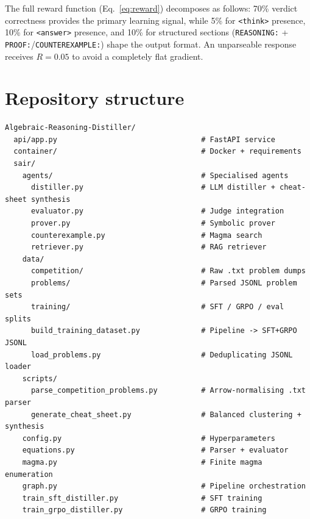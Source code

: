 \documentclass{article}
\begin{document}
The full reward function (Eq.~\ref{eq:reward}) decomposes as follows: 70\% verdict correctness provides the primary learning signal, while 5\% for \texttt{<think>} presence, 10\% for \texttt{<answer>} presence, and 10\% for structured sections (\texttt{REASONING:} + \texttt{PROOF:}/\texttt{COUNTEREXAMPLE:}) shape the output format. An unparseable response receives $R{=}0.05$ to avoid a completely flat gradient.

\section{Repository structure}
\label{app:repo}

\begin{verbatim}
Algebraic-Reasoning-Distiller/
  api/app.py                                 # FastAPI service
  container/                                 # Docker + requirements
  sair/
    agents/                                  # Specialised agents
      distiller.py                           # LLM distiller + cheat-sheet synthesis
      evaluator.py                           # Judge integration
      prover.py                              # Symbolic prover
      counterexample.py                      # Magma search
      retriever.py                           # RAG retriever
    data/
      competition/                           # Raw .txt problem dumps
      problems/                              # Parsed JSONL problem sets
      training/                              # SFT / GRPO / eval splits
      build_training_dataset.py              # Pipeline -> SFT+GRPO JSONL
      load_problems.py                       # Deduplicating JSONL loader
    scripts/
      parse_competition_problems.py          # Arrow-normalising .txt parser
      generate_cheat_sheet.py                # Balanced clustering + synthesis
    config.py                                # Hyperparameters
    equations.py                             # Parser + evaluator
    magma.py                                 # Finite magma enumeration
    graph.py                                 # Pipeline orchestration
    train_sft_distiller.py                   # SFT training
    train_grpo_distiller.py                  # GRPO training
\end{verbatim}

\end{document}
